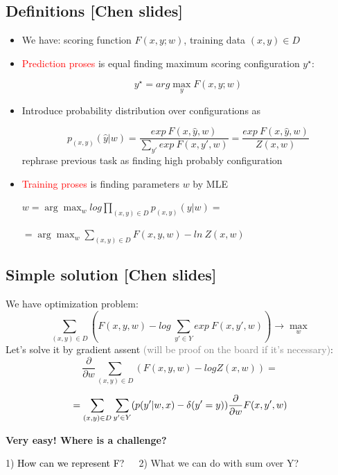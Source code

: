 \documentclass{beamer}
\begin{document}
\subsection*{Definitions [Chen slides]}
\begin{frame}
	\begin{itemize}
		\item We have: scoring function $F(x, y; w)$, training data $(x, y) \in D$
	
		\item \textcolor{red}{Prediction proses} is equal finding maximum scoring configuration $y^\star$:
		
		$$y^\star = arg\max_{y} F(x, y; w)$$
		\item Introduce probability distribution over configurations as
		
		$$p_{(x, y)}(\hat{y}|w) = \frac{exp~F(x, \hat{y}, w)}{\sum_{y'} exp~F(x, y', w)} = \frac{exp~F(x, \hat{y}, w)}{Z(x, w)}$$
		rephrase previous task as finding high probably configuration
		\item \textcolor{red}{Training proses} is finding parameters $w$ by MLE
		
		
		\begin{center}
			$w = \arg\max_{w}log\prod_{(x, y) \in D} p_{(x, y)}(y|w) = $
			
			\vspace{0.2cm}
			
			$= \arg\max_{w}\sum_{(x, y) \in D} F(x, y, w) - ln~Z(x, w) $
		\end{center}	
	\end{itemize}
\end{frame}

\subsection*{Simple solution [Chen slides]}
\begin{frame}
	
	We have optimization problem:
		$$\sum_{(x, y) \in D} \left(F(x, y, w) - log~\sum_{y' \in Y} exp~F(x, y', w)\right) \rightarrow \max_{w}$$
	Let's solve it by gradient assent \small{\textcolor{gray}{(will be proof on the board if it's necessary)}}:
	$$\frac{\partial}{\partial w} \sum_{(x, y) \in D} \left( F(x, y, w) - logZ(x, w) \right) =$$
	
	$$= \sum_{(x, y) \in D} \sum_{y' \in Y} (\textcolor{black}{p(y'|w, x)} - \delta(y'=y)) \frac{\partial}{\partial w} F(x, y', w)$$ 
	
	\begin{center}
		\textbf{Very easy! Where is a challenge?}		
		
		\begin{tcolorbox}[colback=gray!2, colframe=red!90, title=Problem: What If Y is exponentially large!]
			1) \textcolor{black}{How can we represent F?}~~~2) What we can do with sum over Y?
		\end{tcolorbox}
	\end{center}
\end{frame}
\end{document}
